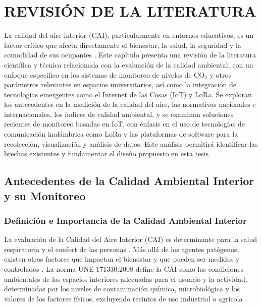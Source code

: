 \chapter{REVISIÓN DE LA LITERATURA}

La calidad del aire interior (CAI), particularmente en entornos educativos, es un factor crítico que afecta directamente el bienestar, la salud, la seguridad y la comodidad de sus ocupantes \cite{lopez_carreno_2025, teba_2021}. Este capítulo presenta una revisión de la literatura científica y técnica relacionada con la evaluación de la calidad ambiental, con un enfoque específico en los sistemas de monitoreo de niveles de CO\(_2\) y otros parámetros relevantes en espacios universitarios, así como la integración de tecnologías emergentes como el Internet de las Cosas (IoT) y LoRa. Se exploran los antecedentes en la medición de la calidad del aire, las normativas nacionales e internacionales, los índices de calidad ambiental, y se examinan soluciones recientes de monitoreo basadas en IoT, con énfasis en el uso de tecnologías de comunicación inalámbrica como LoRa y las plataformas de software para la recolección, visualización y análisis de datos. Este análisis permitirá identificar las brechas existentes y fundamentar el diseño propuesto en esta tesis.
\section{Antecedentes de la Calidad Ambiental Interior y su Monitoreo}

\subsection{Definición e Importancia de la Calidad Ambiental Interior}
La evaluación de la Calidad del Aire Interior (CAI) es determinante para la salud respiratoria y el confort de las personas \cite{sandoval_etal_2020}. Más allá de los agentes patógenos, existen otros factores que impactan el bienestar y que pueden ser medidos y controlados \cite{teba_2021}. La norma UNE 171330:2008 define la CAI como las condiciones ambientales de los espacios interiores adecuadas para el usuario y la actividad, determinadas por los niveles de contaminación química, microbiológica y los valores de los factores físicos, excluyendo recintos de uso industrial o agrícola \cite{teba_2021}.

